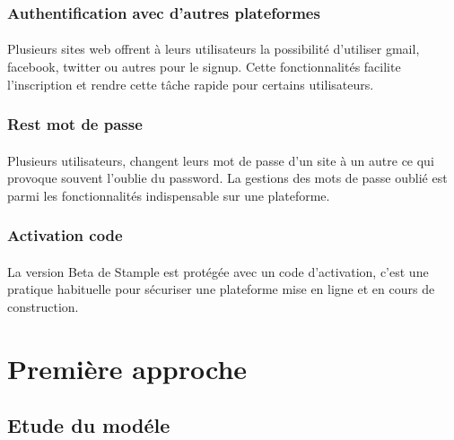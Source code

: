 \subsubsection{Authentification avec d'autres plateformes}
\paragraph{}
Plusieurs sites web offrent à leurs utilisateurs la possibilité d'utiliser gmail, facebook, twitter ou autres pour le signup.
Cette fonctionnalités facilite l'inscription et rendre cette tâche rapide pour certains utilisateurs.
\subsubsection{Rest mot de passe}
\paragraph{}
Plusieurs utilisateurs, changent leurs mot de passe d'un site à un autre ce qui provoque souvent l'oublie du password.
La gestions des mots de passe oublié est parmi les fonctionnalités indispensable sur une plateforme.
\subsubsection{Activation code}
\paragraph{}
La version Beta de Stample est protégée avec un code d'activation, c'est une pratique habituelle pour sécuriser une plateforme mise en ligne et en cours de construction.
\section{Première approche}
\subsection{Etude du modéle}
